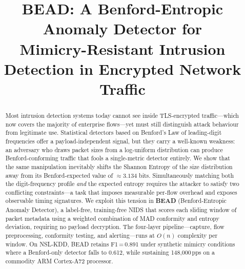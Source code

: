 \documentclass[conference]{IEEEtran}
\begin{document}
\title{BEAD: A Benford-Entropic Anomaly Detector for\\
Mimicry-Resistant Intrusion Detection in Encrypted Network Traffic}

\author{%
\and
{}
}

\maketitle

\begin{abstract}
Most intrusion detection systems today cannot see inside TLS-encrypted
traffic—which now covers the majority of enterprise flows—yet must still
distinguish attack behaviour from legitimate use. Statistical detectors
based on Benford's Law of leading-digit frequencies offer a
payload-independent signal, but they carry a well-known weakness: an
adversary who draws packet sizes from a log-uniform distribution can
produce Benford-conforming traffic that fools a single-metric detector
entirely.
We show that the same manipulation inevitably shifts the Shannon Entropy
of the size distribution away from its Benford-expected value of
$\approx 3.134$ bits.
Simultaneously matching both the digit-frequency profile \textit{and} the
expected entropy requires the attacker to satisfy two conflicting
constraints—a task that imposes measurable per-flow overhead and exposes
observable timing signatures.
We exploit this tension in \textbf{BEAD} (Benford-Entropic Anomaly
Detector), a label-free, training-free NIDS that scores each sliding
window of packet metadata using a weighted combination of MAD conformity
and entropy deviation, requiring no payload decryption.
The four-layer pipeline—capture, flow preprocessing, conformity testing,
and alerting—runs at $O(n)$ complexity per window.
On NSL-KDD, BEAD retains F1\,=\,0.891 under synthetic mimicry conditions
where a Benford-only detector falls to 0.612, while sustaining
148,000\,pps on a commodity ARM Cortex-A72 processor.
\end{abstract}
\end{document}
